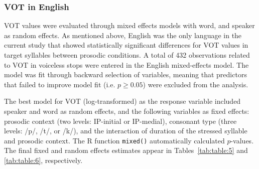 \documentclass[output=paper]{langscibook}
\begin{document}
\begin{table}%
\caption{Proportions of occurrence of burst at /p t k/ release in the sample by prosodic context; $N$ = number of tokens. Significance levels are *** $p<0.001$; ** $p<0.01$}
\label{tab:table:4}
\end{table}



\subsubsection{VOT in English}
VOT values were evaluated through mixed effects models with word, and speaker as random effects. As mentioned above, English was the only language in the current study that showed statistically significant differences for VOT values in target syllables between prosodic conditions. A total of 432 observations related to VOT in voiceless stops were entered in the English mixed-effects model. The model was fit through backward selection of variables, meaning that predictors that failed to improve model fit (i.e. $p\geq0.05$) were excluded from the analysis.


The best model for VOT (log-transformed) as the response variable included speaker and word as random effects, and the following variables as fixed effects: prosodic context (two levels: IP-initial or IP-medial), consonant type (three levels: /p/, /t/, or /k/), and the interaction of duration of the stressed syllable and prosodic context. The R function \texttt{mixed()} automatically calculated $p$-values. The final fixed and random effects estimates appear in Tables~\ref{tab:table:5} and \ref{tab:table:6}, respectively.
\end{document}

